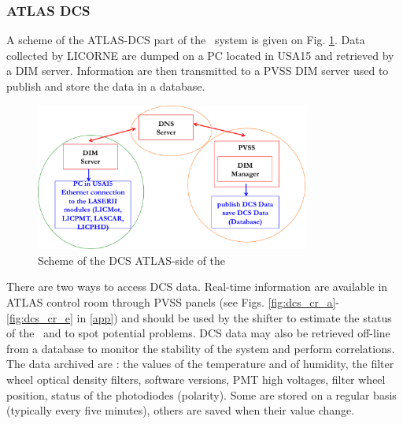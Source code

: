 \subsubsection{ATLAS DCS}

A scheme of the ATLAS-DCS part of the \las~system is given on Fig. \ref{fig:lasdcs}. Data collected by LICORNE are dumped on a PC located in USA15 and retrieved by a DIM server. Information are then transmitted to a PVSS DIM server used to publish and store the data in a database.

\begin{figure}[htbp]
\centering
\includegraphics[width=9cm]{figures/dcs_scheme.png}
\caption{Scheme of the DCS ATLAS-side of the \las}\label{fig:lasdcs}
\end{figure}

There are two ways to access DCS data. Real-time information are available in ATLAS control room through PVSS panels (see Figs. \ref{fig:dcs_cr_a}-\ref{fig:dcs_cr_e} in \ref{app}) and should be used by the shifter to estimate the status of the \laser~and to spot potential problems. DCS data may also be retrieved off-line from a database to monitor the stability of the system and perform correlations. The data archived are : the values of the temperature and of humidity, the filter wheel optical density filters, software versions, PMT high voltages, filter wheel position, status of the photodiodes (polarity). Some are stored on a regular basis (typically every five minutes), others are saved when their value change. 